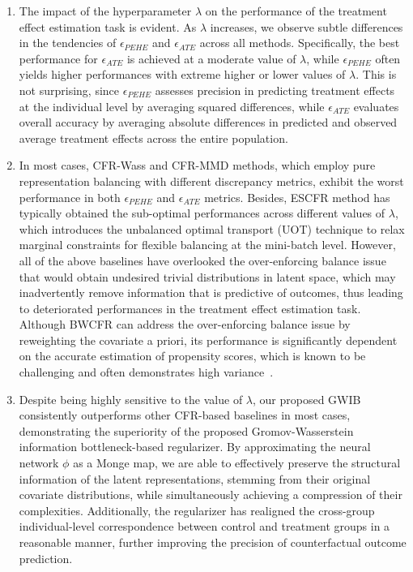 \documentclass{article}
\begin{document}
\begin{enumerate}
\item The impact of the hyperparameter $\lambda$ on the performance of the treatment effect estimation task is evident. 
As \(\lambda\) increases, we observe subtle differences in the tendencies of \(\epsilon_{PEHE}\) and \(\epsilon_{ATE}\) across all methods. 
Specifically, the best performance for $\epsilon_{ATE}$ is achieved at a moderate value of $\lambda$, while $\epsilon_{PEHE}$ often yields higher performances with extreme higher or lower values of $\lambda$. 
This is not surprising, since $\epsilon_{PEHE}$ assesses precision in predicting treatment effects at the individual level by averaging squared differences, while $\epsilon_{ATE}$ evaluates overall accuracy by averaging absolute differences in predicted and observed average treatment effects across the entire population.
\item In most cases, CFR-Wass and CFR-MMD methods, which employ pure representation balancing with different discrepancy metrics, exhibit the worst performance in both $\epsilon_{PEHE}$ and $\epsilon_{ATE}$ metrics. 
Besides, ESCFR method has typically obtained the sub-optimal performances across different values of $\lambda$, which introduces the unbalanced optimal transport (UOT) technique to relax marginal constraints for flexible balancing at the mini-batch level.
However, all of the above baselines have overlooked the over-enforcing balance issue that would obtain undesired trivial distributions in latent space, which may inadvertently remove information that is predictive of outcomes, thus leading to deteriorated performances in the treatment effect estimation task.
Although BWCFR can address the over-enforcing balance issue by reweighting the covariate a priori, its performance is significantly dependent on the accurate estimation of propensity scores, which is known to be challenging and often demonstrates high variance~\cite{caliendo2008some}.

\item Despite being highly sensitive to the value of $\lambda$, our proposed GWIB consistently outperforms other CFR-based baselines in most cases, demonstrating the superiority of the proposed Gromov-Wasserstein information bottleneck-based regularizer. By approximating the neural network $\phi$ as a Monge map, we are able to effectively preserve the structural information of the latent representations, stemming from their original covariate distributions, while simultaneously achieving a compression of their complexities. Additionally, the regularizer has realigned the cross-group individual-level correspondence between control and treatment groups in a reasonable manner, further improving the precision of counterfactual outcome prediction.
\end{enumerate}
\end{document}
